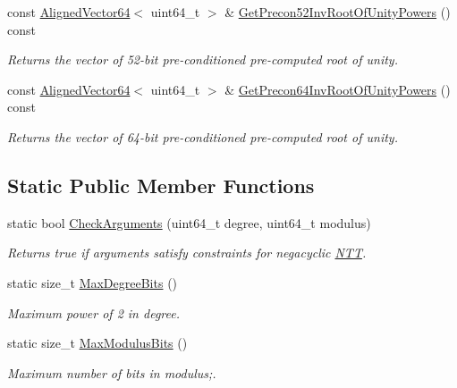 \begin{DoxyCompactItemize}
const \hyperlink{namespaceintel_1_1hexl_afbdf0d2cc4209ee547a88ff22a02801b}{Aligned\+Vector64}$<$ uint64\+\_\+t $>$ \& \hyperlink{classintel_1_1hexl_1_1NTT_a9314e0edf36095233efaf72dc6cb9d5e}{Get\+Precon52\+Inv\+Root\+Of\+Unity\+Powers} () const
\begin{DoxyCompactList}\small\item\em Returns the vector of 52-\/bit pre-\/conditioned pre-\/computed root of unity. \end{DoxyCompactList}\item 
const \hyperlink{namespaceintel_1_1hexl_afbdf0d2cc4209ee547a88ff22a02801b}{Aligned\+Vector64}$<$ uint64\+\_\+t $>$ \& \hyperlink{classintel_1_1hexl_1_1NTT_a0f7f195efe5166b0f3a8c9e71f3a405a}{Get\+Precon64\+Inv\+Root\+Of\+Unity\+Powers} () const
\begin{DoxyCompactList}\small\item\em Returns the vector of 64-\/bit pre-\/conditioned pre-\/computed root of unity. \end{DoxyCompactList}\end{DoxyCompactItemize}
\subsection*{Static Public Member Functions}
\begin{DoxyCompactItemize}
\item 
static bool \hyperlink{classintel_1_1hexl_1_1NTT_a81e461e466f57c1c454564879121d8d3}{Check\+Arguments} (uint64\+\_\+t degree, uint64\+\_\+t modulus)
\begin{DoxyCompactList}\small\item\em Returns true if arguments satisfy constraints for negacyclic \hyperlink{classintel_1_1hexl_1_1NTT}{N\+TT}. \end{DoxyCompactList}\item 
static size\+\_\+t \hyperlink{classintel_1_1hexl_1_1NTT_a76d33e88bd12c2c91b7f8285f8525d72}{Max\+Degree\+Bits} ()
\begin{DoxyCompactList}\small\item\em Maximum power of 2 in degree. \end{DoxyCompactList}\item 
static size\+\_\+t \hyperlink{classintel_1_1hexl_1_1NTT_afa71c9bf13109e0d07cacce9e752357c}{Max\+Modulus\+Bits} ()
\begin{DoxyCompactList}\small\item\em Maximum number of bits in modulus;. \end{DoxyCompactList}\end{DoxyCompactItemize}
